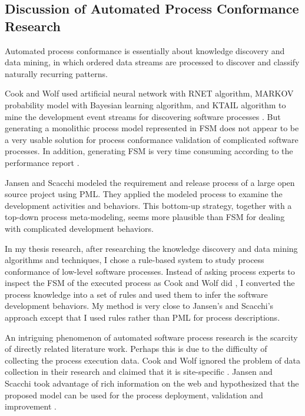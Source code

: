 \documentclass[smallextended]{svjour3}     %
\begin{document}
\subsection{Discussion of Automated Process Conformance Research}
Automated process conformance is essentially about 
knowledge discovery and data mining, in which ordered 
data streams are processed to discover and classify 
naturally recurring patterns. 

Cook and Wolf used artificial neural network with RNET algorithm, 
MARKOV probability model with Bayesian 
learning algorithm, and KTAIL algorithm to mine the development 
event streams for discovering software processes \cite{Cook:95}. 
But generating a monolithic process model represented in FSM 
does not appear to be a very usable solution for process conformance 
validation of complicated software processes. In addition, 
generating FSM is very time consuming according to the 
performance report \cite{Cook:95}.

Jansen and Scacchi \cite{Jensen:04} modeled the requirement and 
release process of a large open source project using PML. They 
applied the modeled process to examine the development activities 
and behaviors. This bottom-up strategy, together with a top-down 
process meta-modeling, seems more plausible than FSM for dealing
with complicated development behaviors.  

In my thesis research, after researching the knowledge discovery
and data mining algorithms and techniques, I chose a rule-based
system to study process conformance of low-level software 
processes. Instead of asking process experts to inspect the
FSM of the executed process as Cook and Wolf did \cite{Cook:95}, 
I converted the process knowledge into a set of rules and used them 
to infer the software development behaviors. My method
is very close to Jansen's and Scacchi's approach \cite{Jensen:04} 
except that I used rules rather than PML for process descriptions. 

An intriguing phenomenon of automated software process research
is the scarcity of directly related literature work. Perhaps this 
is due to the difficulty of collecting the process execution data. 
Cook and Wolf ignored the problem of data collection in their 
research and claimed that it is site-specific \cite{Cook:95}. 
Jansen and Scacchi took advantage of rich information on the web 
and hypothesized that the proposed model can be used for the 
process deployment, validation and improvement \cite{Jensen:04}. 
\end{document}
